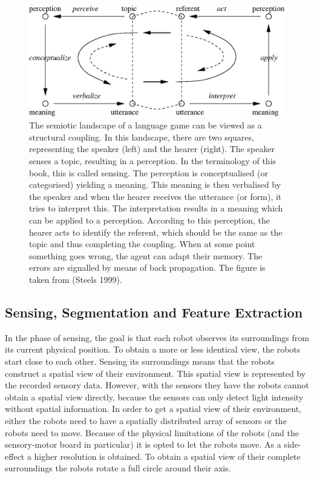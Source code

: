
\begin{figure}[t]
\centerline{\includegraphics[width=12cm]{discr_games/semiotic1.eps}}
\caption{The semiotic landscape of a language game can be viewed as a structural coupling. In this landscape, there are two squares, representing the speaker (left) and the hearer (right). The speaker senses a topic, resulting in a perception. In the terminology of this book, this is called sensing. The perception is conceptualised (or categorised) yielding a meaning. This meaning is then verbalised by the speaker and when the hearer receives the utterance (or form), it tries to interpret this. The interpretation results in a meaning which can be applied to a perception. According to this perception, the hearer acts to identify the referent, which should be the same as the topic and thus completing the coupling. When at some point something goes wrong, the agent can adapt their memory. The errors are signalled by means of back propagation. The figure is taken from (Steels 1999).}
\label{f:cm:semiotic}
\end{figure}

\subsection{Sensing, Segmentation and Feature Extraction}\label{s:lg:perception}


In the phase of sensing, the goal is that each robot observes its surroundings from its current physical position. To obtain a more or less identical view, the robots start close to each other. Sensing its surroundings means that the robots construct a spatial view of their environment. This spatial view is represented by the recorded sensory data. However, with the sensors they have the robots cannot obtain a spatial view directly, because the sensors can only detect light intensity without spatial information. In order to get a spatial view of their environment, either the robots need to have a spatially distributed array of sensors or the robots need to move. Because of the physical limitations of the robots (and the sensory-motor board in particular) it is opted to let the robots move. As a side-effect a higher resolution is obtained. To obtain a spatial view of their complete surroundings the robots rotate a full circle around their axis.

